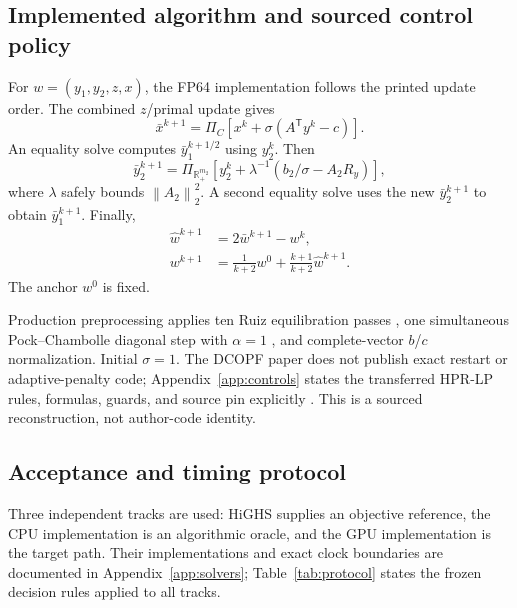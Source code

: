 \documentclass[10pt,journal]{IEEEtran}
\newcommand{\R}{\mathbb{R}}
\newcommand{\norm}[1]{\left\lVert #1\right\rVert}
\begin{document}
\subsection{Implemented algorithm and sourced control policy}

For $w=(y_1,y_2,z,x)$, the FP64 implementation follows the printed update
order. The combined $z$/primal update gives
\begin{equation}
\bar x^{k+1}=\Pi_C\!\left[x^k+\sigma(A^{\mathsf T}y^k-c)\right].
\label{eq:xproj}
\end{equation}
An equality solve computes $\bar y_1^{k+1/2}$ using $y_2^k$. Then
\begin{equation}
\bar y_2^{k+1}=\Pi_{\R_+^{m_2}}
\left[y_2^k+\lambda^{-1}(b_2/\sigma-A_2R_y)\right],
\label{eq:y2}
\end{equation}
where $\lambda$ safely bounds $\norm{A_2}_2^2$. A second equality solve uses
the new $\bar y_2^{k+1}$ to obtain $\bar y_1^{k+1}$. Finally,
\begin{align}
\widehat w^{k+1}&=2\bar w^{k+1}-w^k,\\
w^{k+1}&=\frac{1}{k+2}w^0+
          \frac{k+1}{k+2}\widehat w^{k+1}.
\label{eq:halpern}
\end{align}
The anchor $w^0$ is fixed.

Production preprocessing applies ten Ruiz equilibration passes
\cite{ruiz2001}, one simultaneous Pock--Chambolle diagonal step with
$\alpha=1$ \cite{pock2011}, and complete-vector $b$/$c$ normalization.
Initial $\sigma=1$. The DCOPF paper does not publish exact restart or
adaptive-penalty code; Appendix~\ref{app:controls} states the transferred
HPR-LP rules, formulas, guards, and source pin explicitly
\cite{chen2026}. This is a sourced reconstruction, not author-code identity.

\subsection{Acceptance and timing protocol}

Three independent tracks are used: HiGHS supplies an objective reference, the
CPU implementation is an algorithmic oracle, and the GPU implementation is the
target path. Their implementations and exact clock boundaries are documented
in Appendix~\ref{app:solvers}; Table~\ref{tab:protocol} states the frozen
decision rules applied to all tracks.
\end{document}

